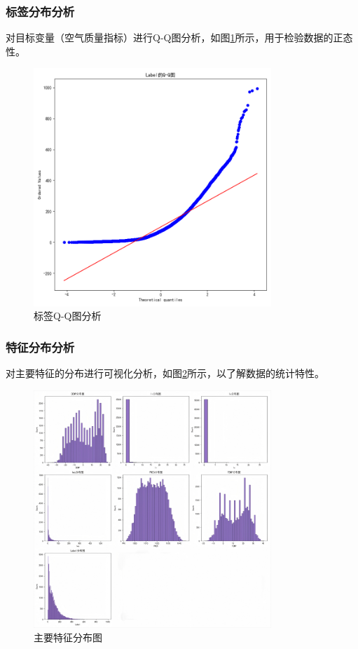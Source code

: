 \subsubsection{标签分布分析}
对目标变量（空气质量指标）进行Q-Q图分析，如图\ref{fig:label_qq}所示，用于检验数据的正态性。

\begin{figure}[H]
    \centering
    \includegraphics[width=0.8\textwidth]{images/eda/label_qq_plot}
    \caption{标签Q-Q图分析}
    \label{fig:label_qq}
\end{figure}

\subsubsection{特征分布分析}
对主要特征的分布进行可视化分析，如图\ref{fig:feature_dist}所示，以了解数据的统计特性。

\begin{figure}[H]
    \centering
    \includegraphics[width=0.8\textwidth]{images/eda/feature_distributions}
    \caption{主要特征分布图}
    \label{fig:feature_dist}
\end{figure}

